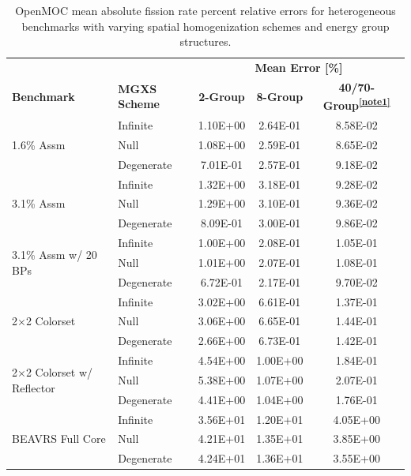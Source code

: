 \begin{table}[ht!]
  \centering
  \caption[Mean OpenMOC fission rate errors]{OpenMOC mean absolute fission rate percent relative errors for heterogeneous benchmarks with varying spatial homogenization schemes and energy group structures.}
  \small
  \label{table:chap8-openmoc-mean-fiss-rates}
  \vspace{6pt}
  \begin{tabular}{l l c c c}
  \toprule
  \rowcolor{lightgray}
  & & \multicolumn{3}{c}{\cellcolor{lightgray} \textbf{Mean Error [\%]}} \\
  \multirow{-2}{*}{\cellcolor{lightgray} \bf Benchmark} &
  \multirow{-2}{*}{\cellcolor{lightgray} \bf \ac{MGXS} Scheme} &
  \multicolumn{1}{c}{{\cellcolor{lightgray} \bf 2-Group}} &
  \multicolumn{1}{c}{{\cellcolor{lightgray} \bf 8-Group}} &
  \multicolumn{1}{c}{{\cellcolor{lightgray} \bf 40/70-Group\textsuperscript{\ref{note1}}}} \\
  \midrule
\multirow{3}{*}{\parbox{2.5cm}{1.6\% Assm}} & Infinite & 1.10E+00 & 2.64E-01 & 8.58E-02 \\
& Null & 1.08E+00 & 2.59E-01 & 8.65E-02 \\
& Degenerate & 7.01E-01 & 2.57E-01 & 9.18E-02 \\
  \midrule
\multirow{3}{*}{\parbox{2.5cm}{3.1\% Assm}} & Infinite & 1.32E+00 & 3.18E-01 & 9.28E-02 \\
& Null & 1.29E+00 & 3.10E-01 & 9.36E-02 \\
& Degenerate & 8.09E-01 & 3.00E-01 & 9.86E-02 \\
  \midrule
\multirow{3}{*}{\parbox{2.5cm}{3.1\% Assm w/ 20 BPs}} & Infinite & 1.00E+00 & 2.08E-01 & 1.05E-01 \\
& Null & 1.01E+00 & 2.07E-01 & 1.08E-01 \\
& Degenerate & 6.72E-01 & 2.17E-01 & 9.70E-02 \\
  \midrule
\multirow{3}{*}{\parbox{2.5cm}{2$\times$2 Colorset}} & Infinite & 3.02E+00 & 6.61E-01 & 1.37E-01 \\
& Null & 3.06E+00 & 6.65E-01 & 1.44E-01 \\
& Degenerate & 2.66E+00 & 6.73E-01 & 1.42E-01 \\
  \midrule
\multirow{3}{*}{\parbox{2.5cm}{2$\times$2 Colorset w/ Reflector}} & Infinite & 4.54E+00 & 1.00E+00 & 1.84E-01 \\
& Null & 5.38E+00 & 1.07E+00 & 2.07E-01 \\
& Degenerate & 4.41E+00 & 1.04E+00 & 1.76E-01 \\
  \midrule
\multirow{3}{*}{\parbox{2.5cm}{BEAVRS Full Core}} & Infinite & 3.56E+01 & 1.20E+01 & 4.05E+00 \\
& Null & 4.21E+01 & 1.35E+01 & 3.85E+00 \\
& Degenerate & 4.24E+01 & 1.36E+01 & 3.55E+00 \\
  \bottomrule
\end{tabular}
\end{table}

